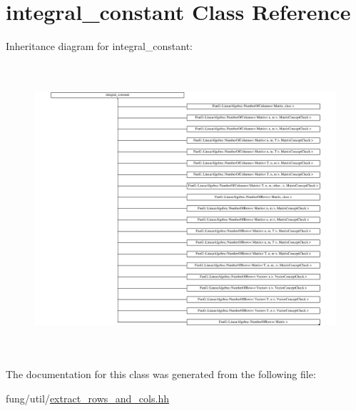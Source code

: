 \hypertarget{classstd_1_1integral__constant}{\section{integral\-\_\-constant \-Class \-Reference}
\label{classstd_1_1integral__constant}
}
\-Inheritance diagram for integral\-\_\-constant\-:\begin{figure}[H]
\begin{center}
\leavevmode
\includegraphics[height=10.769231cm]{classstd_1_1integral__constant}
\end{center}
\end{figure}


\-The documentation for this class was generated from the following file\-:\begin{DoxyCompactItemize}
\item 
fung/util/\hyperlink{extract__rows__and__cols_8hh}{extract\-\_\-rows\-\_\-and\-\_\-cols.\-hh}\end{DoxyCompactItemize}
